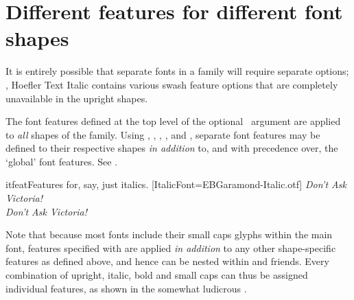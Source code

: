 \documentclass[a4paper]{l3doc}
\begin{document}
\section{Different features for different font shapes}
\label{sec:bfit-feat}


It is entirely possible that separate fonts in a family will require
separate options; \eg, Hoefler Text Italic contains various swash
feature options that are completely unavailable in the upright shapes.

The font features defined at the top level of the optional \cmd\fontspec\
argument are applied to \emph{all} shapes of the family.
Using , , ,
, and ,
separate font features may be defined to their respective shapes
\emph{in addition} to, and with precedence over, the `global' font features.
See \exref{itfeat}.

\begin{Xexample}{itfeat}{Features for, say, just italics.}
%
  [ItalicFont=EBGaramond-Italic.otf]
\itshape Don’t Ask Victoria! \\
Don’t Ask Victoria! \\
\end{Xexample}

Note that because most fonts include their small caps glyphs
within the main font, features specified with  are applied \emph{in addition} to
any other shape-specific features as defined above, and hence \feat{SmallCapsFeatures}
can be nested within \feat{ItalicFeatures} and friends. Every combination
of upright, italic, bold and small caps can thus be assigned individual
features, as shown in the somewhat ludicrous \exref{scfeat}.
\end{document}
